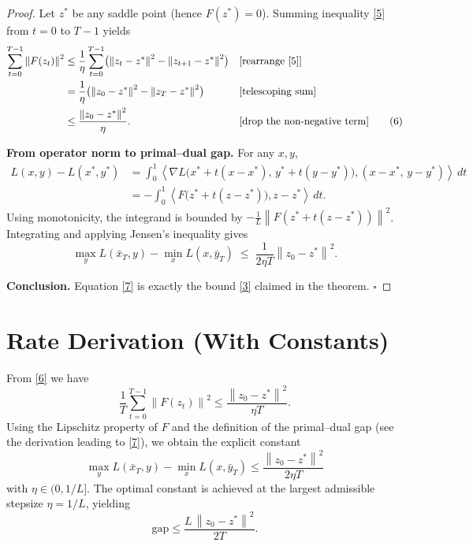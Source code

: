 \documentclass{article}
\newcommand{\norm}[1]{\left\|#1\right\|}
\newcommand{\inner}[2]{\left\langle #1,#2 \right\rangle}
\begin{document}
\begin{proof}
Let $z^{*}$ be any saddle point (hence $F(z^{*})=0$). Summing inequality \eqref{5} from $t=0$ to $T-1$ yields
\[
\begin{aligned}
\sum_{t=0}^{T-1}\norm{F(z_{t})}^{2}
&\le
\frac{1}{\eta}\sum_{t=0}^{T-1}\bigl(\norm{z_{t}-z^{*}}^{2}
      -\norm{z_{t+1}-z^{*}}^{2}\bigr)                                 &&\text{[rearrange \eqref{5}]}\\
&=\frac{1}{\eta}\bigl(\norm{z_{0}-z^{*}}^{2}
      -\norm{z_{T}-z^{*}}^{2}\bigr)                                    &&\text{[telescoping sum]}\\
&\le\frac{\norm{z_{0}-z^{*}}^{2}}{\eta}.                               &&\text{[drop the non‑negative term]}
\tag{6}
\end{aligned}
\]

\medskip
\noindent\textbf{From operator norm to primal–dual gap.}  
For any $x,y$,
\[
\begin{aligned}
L(x,y)-L(x^{*},y^{*})
&= \int_{0}^{1}\inner{\nabla L\bigl(x^{*}+t(x-x^{*}),\,y^{*}+t(y-y^{*})\bigr)}
                     {(x-x^{*},\,y-y^{*})}\,dt                        \\
&= -\int_{0}^{1}\inner{F\bigl(z^{*}+t(z-z^{*})\bigr)}{z-z^{*}}\,dt.
\end{aligned}
\]
Using monotonicity, the integrand is bounded by $-\frac{1}{L}\norm{F(z^{*}+t(z-z^{*}))}^{2}$. Integrating and applying Jensen’s inequality gives
\[
\max_{y}L(\bar x_{T},y)-\min_{x}L(x,\bar y_{T})
\;\le\;
\frac{1}{2\eta T}\norm{z_{0}-z^{*}}^{2}.                     \tag{7}
\]

\medskip
\noindent\textbf{Conclusion.} Equation \eqref{7} is exactly the bound \eqref{3} claimed in the theorem. \hfill $\square$
\end{proof}

\section*{Rate Derivation (With Constants)}
From \eqref{6} we have
\[
\frac{1}{T}\sum_{t=0}^{T-1}\norm{F(z_{t})}^{2}
\le\frac{\norm{z_{0}-z^{*}}^{2}}{\eta T}.
\tag{8}
\]
Using the Lipschitz property of $F$ and the definition of the primal–dual gap (see the derivation leading to \eqref{7}), we obtain the explicit constant
\[
\boxed{\;
\max_{y}L(\bar x_{T},y)-\min_{x}L(x,\bar y_{T})
\le
\frac{\norm{z_{0}-z^{*}}^{2}}{2\eta T}\;}
\]
with $\eta\in(0,1/L]$. The optimal constant is achieved at the largest admissible stepsize $\eta=1/L$, yielding
\[
\text{gap}\le \frac{L\,\norm{z_{0}-z^{*}}^{2}}{2T}.
\]
\end{document}
